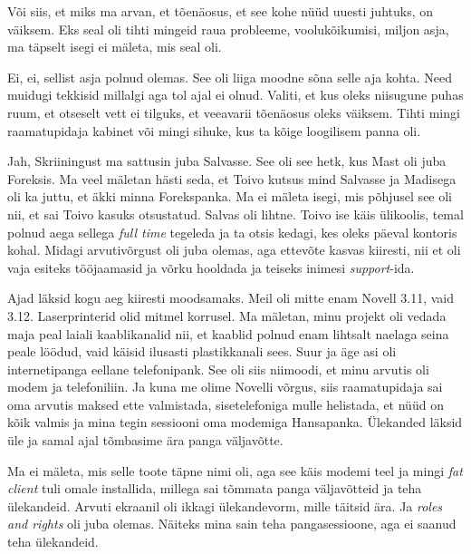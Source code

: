 
Või siis, et miks ma arvan, et tõenäosus, et see kohe nüüd uuesti juhtuks, on 
väiksem. Eks seal oli tihti mingeid raua probleeme, voolukõikumisi, miljon 
asja, ma täpselt isegi ei mäleta, mis seal oli. 


Ei, ei, sellist asja polnud olemas. See oli liiga moodne sõna selle aja kohta. 
Need muidugi tekkisid millalgi aga tol ajal ei olnud. Valiti, et kus oleks 
niisugune puhas ruum, et otseselt vett ei tilguks, et  veeavarii tõenäosus 
oleks väiksem. Tihti mingi raamatupidaja kabinet või mingi sihuke, kus ta kõige 
loogilisem panna oli. 


Jah, Skriiningust ma sattusin juba Salvasse. See oli 
see hetk, kus Mast oli juba 
Foreksis. Ma veel mäletan hästi seda, et 
Toivo kutsus mind Salvasse ja Madisega oli ka juttu, 
et äkki minna Forekspanka. Ma ei mäleta isegi, mis põhjusel see oli nii, et sai 
Toivo kasuks otsustatud. Salvas oli lihtne. Toivo ise käis ülikoolis, temal 
polnud aega sellega \emph{full time} tegeleda ja ta otsis kedagi, kes oleks 
päeval kontoris kohal. Midagi arvutivõrgust oli juba olemas, aga  
ettevõte kasvas  kiiresti, nii et  oli vaja esiteks tööjaamasid ja võrku 
hooldada ja teiseks inimesi \emph{support}-ida. 

Ajad läksid kogu aeg kiiresti moodsamaks. Meil oli mitte enam 
Novell 3.11, vaid 3.12. Laserprinterid olid mitmel korrusel. Ma 
mäletan, minu projekt oli vedada maja peal laiali kaablikanalid nii, et kaablid 
polnud enam lihtsalt naelaga seina peale löödud, vaid käisid ilusasti 
plastikkanali sees. Suur ja äge asi oli internetipanga eellane telefonipank. 
See oli siis niimoodi, et minu arvutis oli modem ja telefoniliin. Ja kuna me 
olime  Novelli võrgus, siis raamatupidaja sai oma arvutis maksed ette 
valmistada, sisetelefoniga mulle helistada, et nüüd on kõik valmis ja mina 
tegin  sessiooni oma modemiga Hansapanka. Ülekanded 
läksid üle ja samal ajal tõmbasime ära panga väljavõtte. 


Ma ei mäleta, mis selle toote täpne nimi oli, aga see käis modemi teel ja mingi 
\emph{fat client} tuli omale installida, millega sai tõmmata panga väljavõtteid 
ja teha ülekandeid. Arvuti ekraanil oli ikkagi ülekandevorm, mille täitsid ära. 
Ja \emph{roles and rights} oli juba olemas. Näiteks mina sain teha  
pangasessioone, aga ei saanud teha ülekandeid. 

